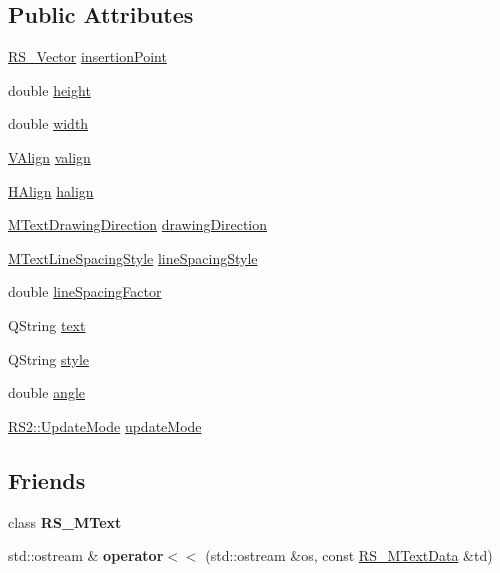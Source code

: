 \subsection*{Public Attributes}
\begin{DoxyCompactItemize}
\item 
\hyperlink{classRS__Vector}{R\-S\-\_\-\-Vector} \hyperlink{classRS__MTextData_a98cf185db140a1f8228e540a8b13053e}{insertion\-Point}
\item 
double \hyperlink{classRS__MTextData_a6fa9e4fb1c385e168498576356a9829c}{height}
\item 
double \hyperlink{classRS__MTextData_ad0be22729fac2b25845dcc5a67dde87b}{width}
\item 
\hyperlink{classRS__MTextData_a9f1c092c22fc207e48e1f3f23b93d54f}{V\-Align} \hyperlink{classRS__MTextData_ac31d2023d1a931c657d458f86a7ded60}{valign}
\item 
\hyperlink{classRS__MTextData_ad819fe18c56a345fcfb205705c0445cc}{H\-Align} \hyperlink{classRS__MTextData_ac5bd7fcfc21e0adccc5db96e150a1d49}{halign}
\item 
\hyperlink{classRS__MTextData_adec4363b7757d3c574a6216049177bb3}{M\-Text\-Drawing\-Direction} \hyperlink{classRS__MTextData_ae394311f49613c7a90950515b7bd107a}{drawing\-Direction}
\item 
\hyperlink{classRS__MTextData_ada9028cb480af4b0365164c6edd4a3ad}{M\-Text\-Line\-Spacing\-Style} \hyperlink{classRS__MTextData_a67cb4ea65820958aa4b820d988bec25e}{line\-Spacing\-Style}
\item 
double \hyperlink{classRS__MTextData_a065b68a34a4049cf33063b726049525f}{line\-Spacing\-Factor}
\item 
Q\-String \hyperlink{classRS__MTextData_ae12dd4012706f9fbda7298b5fd0ec52e}{text}
\item 
Q\-String \hyperlink{classRS__MTextData_ad804c51861eb1e111cdb281b412f7cb5}{style}
\item 
double \hyperlink{classRS__MTextData_a979811e38ef83634a3276e3d6f961cc7}{angle}
\item 
\hyperlink{classRS2_ab05150052f314f729c76afff34f89bc5}{R\-S2\-::\-Update\-Mode} \hyperlink{classRS__MTextData_a870f67ddc1085f966d1f1fc3d87c8aaa}{update\-Mode}
\end{DoxyCompactItemize}
\subsection*{Friends}
\begin{DoxyCompactItemize}
\item 
\hypertarget{classRS__MTextData_a142b7d8d2e212d5ecfbcc673a56e1092}{class {\bfseries R\-S\-\_\-\-M\-Text}}\label{classRS__MTextData_a142b7d8d2e212d5ecfbcc673a56e1092}

\item 
\hypertarget{classRS__MTextData_a8cde1d32199d8cdf466bb9df35c0f3bc}{std\-::ostream \& {\bfseries operator$<$$<$} (std\-::ostream \&os, const \hyperlink{classRS__MTextData}{R\-S\-\_\-\-M\-Text\-Data} \&td)}\label{classRS__MTextData_a8cde1d32199d8cdf466bb9df35c0f3bc}

\end{DoxyCompactItemize}



